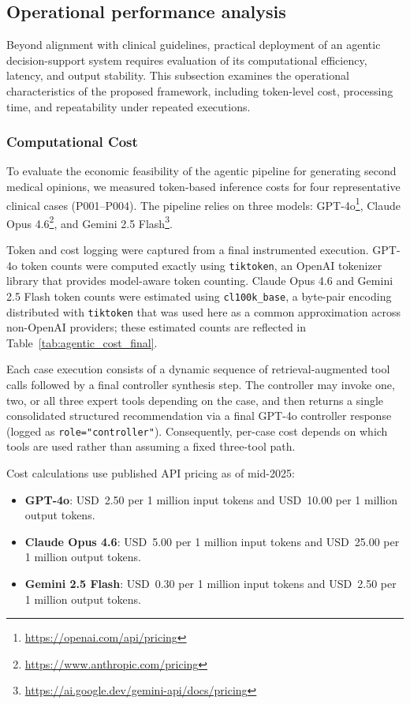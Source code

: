 \documentclass[preprint,12pt]{elsarticle}
\begin{document}
\subsection{Operational performance analysis}
\label{sec:operational}

Beyond alignment with clinical guidelines, practical deployment of an agentic decision-support system requires evaluation of its computational efficiency, latency, and output stability. This subsection examines the operational characteristics of the proposed framework, including token-level cost, processing time, and repeatability under repeated executions.


\subsubsection{Computational Cost}

To evaluate the economic feasibility of the agentic pipeline for generating second medical opinions, we measured token-based inference costs for four representative clinical cases (P001--P004). The pipeline relies on three models: GPT-4o\footnote{\url{https://openai.com/api/pricing}}, Claude Opus 4.6\footnote{\url{https://www.anthropic.com/pricing}}, and Gemini 2.5 Flash\footnote{\url{https://ai.google.dev/gemini-api/docs/pricing}}.

Token and cost logging were captured from a final instrumented execution. GPT-4o token counts were computed exactly using \texttt{tiktoken}, an OpenAI tokenizer library that provides model-aware token counting. Claude Opus 4.6 and Gemini 2.5 Flash token counts were estimated using \texttt{cl100k\_base}, a byte-pair encoding distributed with \texttt{tiktoken} that was used here as a common approximation across non-OpenAI providers; these estimated counts are reflected in Table~\ref{tab:agentic_cost_final}.

Each case execution consists of a dynamic sequence of retrieval-augmented tool calls followed by a final controller synthesis step. The controller may invoke one, two, or all three expert tools depending on the case, and then returns a single consolidated structured recommendation via a final GPT-4o controller response (logged as \texttt{role="controller"}). Consequently, per-case cost depends on which tools are used rather than assuming a fixed three-tool path.

Cost calculations use published API pricing as of mid-2025:

\begin{itemize}
    \item \textbf{GPT-4o}: USD~2.50 per 1 million input tokens and USD~10.00 per 1 million output tokens.
    \item \textbf{Claude Opus 4.6}: USD~5.00 per 1 million input tokens and USD~25.00 per 1 million output tokens.
    \item \textbf{Gemini 2.5 Flash}: USD~0.30 per 1 million input tokens and USD~2.50 per 1 million output tokens.
\end{itemize}
\end{document}
